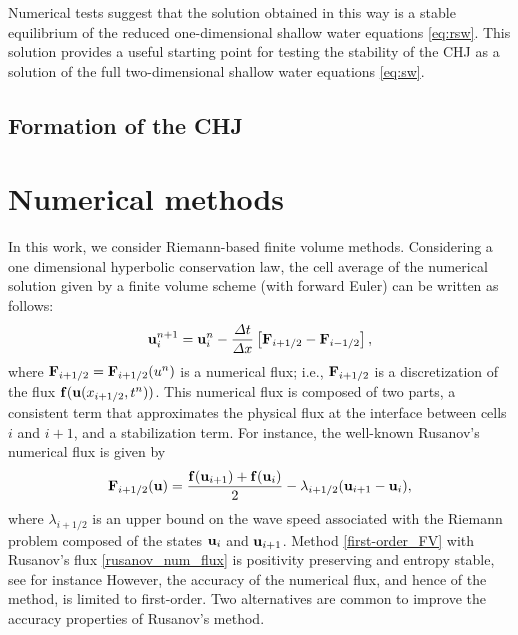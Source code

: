 \documentclass[preprint, 11pt]{article}
\newcommand{\bff}{{\bf f}}
\newcommand{\bfF}{{\bf F}}
\newcommand{\bfu}{{\bf u}}
\begin{document}
Numerical tests suggest that the solution obtained in this way is a stable equilibrium
of the reduced one-dimensional shallow water equations \eqref{eq:rsw}.  This
solution provides a useful starting point for testing the stability of the CHJ
as a solution of the full two-dimensional shallow water equations \eqref{eq:sw}.

\subsection{Formation of the CHJ}\label{sec:formation}

\clearpage
\section{Numerical methods}
In this work, we consider Riemann-based finite volume methods.
Considering a one dimensional hyperbolic conservation law,
the cell average of the numerical solution given by a 
finite volume scheme (with forward Euler) can be written as follows:
\begin{align}\label{first-order_FV}
  \bfu_i^{n+1}=\bfu_i^n-\frac{\Delta t}{\Delta x}\left[\bfF_{i+1/2}-\bfF_{i-1/2}\right],
\end{align}
where $\bfF_{i+1/2}=\bfF_{i+1/2}(u^n)$ is a numerical flux; i.e., $\bfF_{i+1/2}$ is 
a discretization of the flux $\bff(\bfu(x_{i+1/2},t^n))$. 
This numerical flux is composed of two parts, a consistent term that approximates 
the physical flux at the interface between cells $i$ and $i+1$, and a stabilization term. 
For instance, the well-known Rusanov's numerical flux is given by 
\begin{align}\label{rusanov_num_flux}
  \bfF_{i+1/2}(\bfu)=\frac{\bff(\bfu_{i+1})+\bff(\bfu_i)}{2} - \lambda_{i+1/2}(\bfu_{i+1}-\bfu_i),
\end{align}
where $\lambda_{i+1/2}$ is an upper bound on the wave speed associated with the Riemann problem 
composed of the states $\bfu_i$ and $\bfu_{i+1}$. 
Method \eqref{first-order_FV} with Rusanov's flux \eqref{rusanov_num_flux}
is positivity preserving and entropy stable, see for instance 
\cite{perthame1996positivity,tadmor2003entropy,guermond2016invariant}
However, the accuracy of the numerical flux, and hence of the method, is 
limited to first-order. 
Two alternatives are common to improve the accuracy properties of Rusanov's method.
\end{document}
